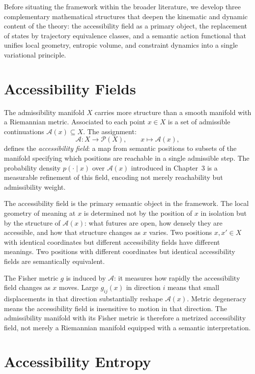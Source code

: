 \documentclass[12pt, oneside]{book}
\theoremstyle{plain-flyxion}
\theoremstyle{definition-flyxion}
\newcommand{\A}{\mathcal{A}}
\begin{document}
Before situating the framework within the broader literature, we develop three
complementary mathematical structures that deepen the kinematic and dynamic content of
the theory: the accessibility field as a primary object, the replacement of states by
trajectory equivalence classes, and a semantic action functional that unifies local
geometry, entropic volume, and constraint dynamics into a single variational principle.

\section{Accessibility Fields}

The admissibility manifold $X$ carries more structure than a smooth manifold with a
Riemannian metric. Associated to each point $x \in X$ is a set of admissible continuations
$\A(x) \subseteq X$. The assignment:
\begin{equation}\label{eq:access-field}
\mathcal{A}: X \to \mathcal{P}(X), \qquad x \mapsto \A(x),
\end{equation}
defines the \emph{accessibility field}: a map from semantic positions to subsets of the
manifold specifying which positions are reachable in a single admissible step. The
probability density $p(\cdot \mid x)$ over $\A(x)$ introduced in Chapter~3 is a
measurable refinement of this field, encoding not merely reachability but admissibility
weight.

The accessibility field is the primary semantic object in the framework. The local
geometry of meaning at $x$ is determined not by the position of $x$ in isolation but by
the structure of $\A(x)$: what futures are open, how densely they are accessible, and
how that structure changes as $x$ varies. Two positions $x, x' \in X$ with identical
coordinates but different accessibility fields have different meanings. Two positions with
different coordinates but identical accessibility fields are semantically equivalent.

The Fisher metric $g$ is induced by $\mathcal{A}$: it measures how rapidly the
accessibility field changes as $x$ moves. Large $g_{ij}(x)$ in direction $i$ means that
small displacements in that direction substantially reshape $\A(x)$. Metric degeneracy
means the accessibility field is insensitive to motion in that direction. The admissibility
manifold with its Fisher metric is therefore a metrized accessibility field, not merely a
Riemannian manifold equipped with a semantic interpretation.

\section{Accessibility Entropy}
\end{document}
